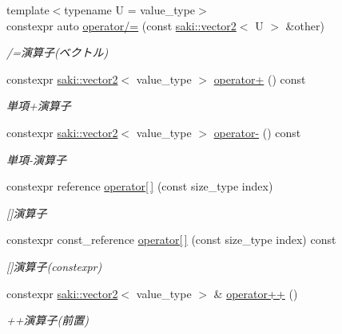 \begin{DoxyCompactItemize}
{\footnotesize template$<$typename U  = value\+\_\+type$>$ }\\constexpr auto \mbox{\hyperlink{classsaki_1_1vector2_afd078748b33fd375b943a46057ace9ee}{operator/=}} (const \mbox{\hyperlink{classsaki_1_1vector2}{saki\+::vector2}}$<$ U $>$ \&other)
\begin{DoxyCompactList}\small\item\em /=演算子(ベクトル) \end{DoxyCompactList}\item 
constexpr \mbox{\hyperlink{classsaki_1_1vector2}{saki\+::vector2}}$<$ value\+\_\+type $>$ \mbox{\hyperlink{classsaki_1_1vector2_a860342168e4b74d2b3190d7383c144a5}{operator+}} () const
\begin{DoxyCompactList}\small\item\em 単項+演算子 \end{DoxyCompactList}\item 
constexpr \mbox{\hyperlink{classsaki_1_1vector2}{saki\+::vector2}}$<$ value\+\_\+type $>$ \mbox{\hyperlink{classsaki_1_1vector2_a92def26a2ee843e86295ba3bf5d56d31}{operator-\/}} () const
\begin{DoxyCompactList}\small\item\em 単項-\/演算子 \end{DoxyCompactList}\item 
constexpr reference \mbox{\hyperlink{classsaki_1_1vector2_a6bf127ca7ecdf4bc069bb172a147be1e}{operator\mbox{[}$\,$\mbox{]}}} (const size\+\_\+type index)
\begin{DoxyCompactList}\small\item\em \mbox{[}\mbox{]}演算子 \end{DoxyCompactList}\item 
constexpr const\+\_\+reference \mbox{\hyperlink{classsaki_1_1vector2_a31bc36eae8002f6616026a33bcd4d6f7}{operator\mbox{[}$\,$\mbox{]}}} (const size\+\_\+type index) const
\begin{DoxyCompactList}\small\item\em \mbox{[}\mbox{]}演算子(constexpr) \end{DoxyCompactList}\item 
constexpr \mbox{\hyperlink{classsaki_1_1vector2}{saki\+::vector2}}$<$ value\+\_\+type $>$ \& \mbox{\hyperlink{classsaki_1_1vector2_a47ae623f11d6f9cde6230b0d934bd54e}{operator++}} ()
\begin{DoxyCompactList}\small\item\em ++演算子(前置) \end{DoxyCompactList}\item 

\end{DoxyCompactItemize}
